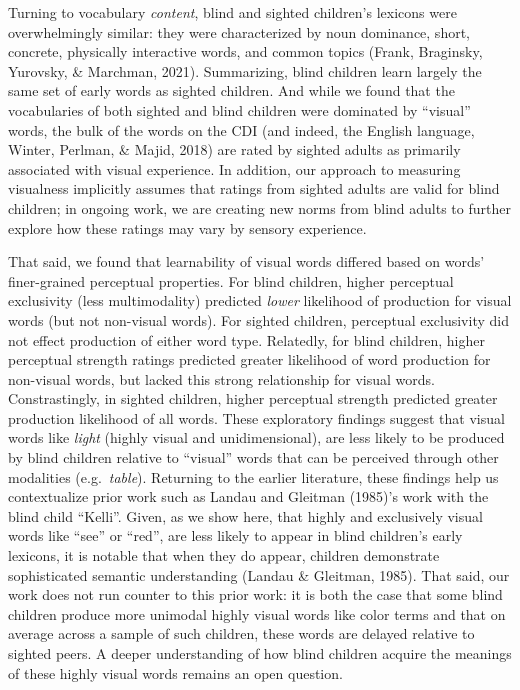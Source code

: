 \documentclass[
  man,floatsintext]{apa6}
\begin{document}
Turning to vocabulary \emph{content}, blind and sighted children's lexicons were overwhelmingly similar: they were characterized by noun dominance, short, concrete, physically interactive words, and common topics (Frank, Braginsky, Yurovsky, \& Marchman, 2021). Summarizing, blind children learn largely the same set of early words as sighted children. And while we found that the vocabularies of both sighted and blind children were dominated by ``visual'' words, the bulk of the words on the CDI (and indeed, the English language, Winter, Perlman, \& Majid, 2018) are rated by sighted adults as primarily associated with visual experience. In addition, our approach to measuring visualness implicitly assumes that ratings from sighted adults are valid for blind children; in ongoing work, we are creating new norms from blind adults to further explore how these ratings may vary by sensory experience.

That said, we found that learnability of visual words differed based on words' finer-grained perceptual properties. For blind children, higher perceptual exclusivity (less multimodality) predicted \emph{lower} likelihood of production for visual words (but not non-visual words). For sighted children, perceptual exclusivity did not effect production of either word type. Relatedly, for blind children, higher perceptual strength ratings predicted greater likelihood of word production for non-visual words, but lacked this strong relationship for visual words. Constrastingly, in sighted children, higher perceptual strength predicted greater production likelihood of all words. These exploratory findings suggest that visual words like \emph{light} (highly visual and unidimensional), are less likely to be produced by blind children relative to ``visual'' words that can be perceived through other modalities (e.g.~\emph{table}). Returning to the earlier literature, these findings help us contextualize prior work such as Landau and Gleitman (1985)'s work with the blind child ``Kelli''. Given, as we show here, that highly and exclusively visual words like ``see'' or ``red'', are less likely to appear in blind children's early lexicons, it is notable that when they do appear, children demonstrate sophisticated semantic understanding (Landau \& Gleitman, 1985). That said, our work does not run counter to this prior work: it is both the case that some blind children produce more unimodal highly visual words like color terms and that on average across a sample of such children, these words are delayed relative to sighted peers. A deeper understanding of how blind children acquire the meanings of these highly visual words remains an open question.
\end{document}
